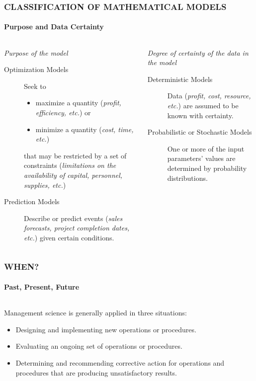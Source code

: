 \documentclass[14 pt]{beamer}
\begin{document}
\begin{frame}[t]
\frametitle{CLASSIFICATION OF MATHEMATICAL MODELS}
\framesubtitle{Purpose and Data Certainty}

\begin{columns}[t]
\begin{column}{0.45\textwidth}
\emph{Purpose of the model}
\vskip0.5cm%
\begin{description}
  \item [Optimization Models] Seek to
\begin{itemize}
  \item maximize a quantity (\emph{profit, efficiency, etc.}) or
  \item minimize a quantity (\emph{cost, time, etc.})
\end{itemize}
that may be restricted by a set of constraints (\emph{limitations on the availability of capital, personnel, supplies, etc.})
  \item [Prediction Models] Describe or predict events (\emph{sales forecasts, project completion dates, etc.}) given certain conditions.
\end{description}
\end{column}

\begin{column}{0.45\textwidth}
\emph{Degree of certainty of the data in the model}
\vskip0.5cm%
\begin{description}
  \item [Deterministic Models] Data (\emph{profit, cost, resource, etc.}) are assumed to be known with certainty.
  \item [Probabilistic or Stochastic Models] One or more of the input parameters’ values are determined by probability distributions.
\end{description}
\end{column}
\end{columns}
\end{frame}


\begin{frame}[t]
\frametitle{WHEN?}
\framesubtitle{Past, Present, Future}

\begin{columns}[t]
\begin{column}{0.45\textwidth}
Management science is generally applied in three situations:
\vskip0.5cm%
\begin{itemize}
  \item Designing and implementing new operations or procedures.
  \item Evaluating an ongoing set of operations or procedures.
  \item Determining and recommending corrective action for operations and procedures that are producing unsatisfactory results.
\end{itemize}
\end{column}

\begin{column}{0.45\textwidth}
\end{column}
\end{columns}
\end{frame}
\end{document}
